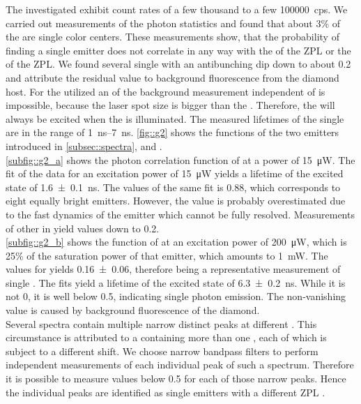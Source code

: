 	The investigated \sivs exhibit count rates of a few thousand to a few \SI{100000}{cps}.
	We carried out measurements of the photon statistics and found that about 3\% of the \sivs are single color centers.
	These measurements show, that the probability of finding a single emitter does not correlate in any way with the \cwl of the ZPL or the \lw of the ZPL.
	We found several single \sivs with an antibunching dip down to about \num{0.2} and attribute the residual \gtz value to background fluorescence from the diamond host.
	For the utilized \nds an of the background measurement independent of \siv \pl is impossible, because the laser spot size is bigger than the \nd. 
	Therefore, the \siv will always be excited when the \nd is illuminated.
	The measured lifetimes of the single \sivs are in the range of \SIrange{1}{7}{ns}.
	\autoref{fig::g2} shows the \gt functions of the two emitters introduced in \autoref{subsec::spectra}, \emnarrow and \embroad.
	\\
	\autoref{subfig::g2_a} shows the photon correlation function of \emnarrow at a power of \SI{15}{\micro\W}. 
	The fit of the data for an excitation power of \SI{15}{\micro\W} yields a lifetime of the excited state of \SI[separate-uncertainty]{1.6\pm0.1}{ns}.
	The \gtz values of the same fit is \num{0.88}, which corresponds to eight equally bright emitters.
	However, the \gtz value is probably overestimated due to the fast dynamics of the emitter which cannot be fully resolved.
	Measurements of other \sivs in \gh yield \gtz values down to \num[separate-uncertainty]{0.2}.
	\\
	\autoref{subfig::g2_b} shows the \gt function of \embroad at an excitation power of \SI{200}{\micro\W}, which is 25\% of the saturation power of that emitter, which amounts to \SI{1}{mW}.
	The \gtz values for yields \num[separate-uncertainty]{0.16\pm0.06}, therefore being a representative \gt measurement of single \sivs.
	The fits yield a lifetime of the excited state of \SI[separate-uncertainty]{6.3\pm0.2}{ns}.
	While it is not 0, it is well below \num{0.5}, indicating single photon emission.
	The non-vanishing \gtz value is caused by background fluorescence of the diamond.
	\\
	Several spectra contain multiple narrow distinct peaks at different \ZPL \cwls.
	This circumstance is attributed to a \nd containing more than one \siv, each of which is subject to a different \cwl shift.
	We choose narrow bandpass filters to perform independent measurements of each individual \siv peak of such a spectrum.
	Therefore it is possible to measure \gtz values below \num{0.5} for each of those narrow peaks.
	Hence the individual peaks are identified as single emitters with a different ZPL \cwl.
	\\
	\begin{figure}[tp]

	\end{figure}

